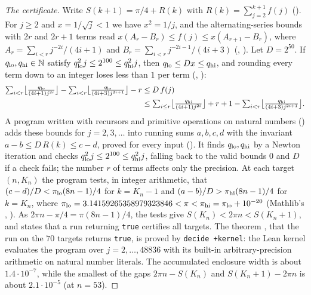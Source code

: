 \documentclass[11pt]{amsart}
\theoremstyle{plain}
\theoremstyle{definition}
\newcommand{\N}{\mathbb{N}}
\begin{document}
\begin{proof}[The certificate]
Write $S(k+1)=\pi/4+R(k)$ with $R(k)=\sum_{j=2}^{k+1}f(j)$ ().
For $j\ge2$ and $x=1/\sqrt j<1$ we have $x^2=1/j$, and the alternating-series bounds with $2r$ and $2r+1$ terms read $x(A_r-B_r)\le f(j)\le x(A_{r+1}-B_r)$, where $A_r=\sum_{i<r}j^{-2i}/(4i+1)$ and $B_r=\sum_{i<r}j^{-2i-1}/(4i+3)$ (, ).
Let $D=2^{50}$. If $q_{\rm lo},q_{\rm hi}\in\N$ satisfy $q_{\rm lo}^2j\le2^{100}\le q_{\rm hi}^2j$, then $q_{\rm lo}\le Dx\le q_{\rm hi}$, and rounding every term down to an integer loses less than $1$ per term (, ):
\begin{align*}
  \textstyle\sum_{i<r}\bigl\lfloor\frac{q_{\rm lo}}{(4i+1)j^{2i}}\bigr\rfloor-\sum_{i<r}\bigl\lfloor\frac{q_{\rm lo}}{(4i+3)j^{2i+1}}\bigr\rfloor-r
  &\le D\,f(j)\\
  &\le\textstyle\sum_{i\le r}\bigl\lfloor\frac{q_{\rm hi}}{(4i+1)j^{2i}}\bigr\rfloor+r+1-\sum_{i<r}\bigl\lfloor\frac{q_{\rm hi}}{(4i+3)j^{2i+1}}\bigr\rfloor .
\end{align*}
A program written with recursors and primitive operations on natural numbers () adds these bounds for $j=2,3,\dots$ into running sums $a,b,c,d$ with the invariant $a-b\le D\,R(k)\le c-d$, proved for every input ().
It finds $q_{\rm lo},q_{\rm hi}$ by a Newton iteration and checks $q_{\rm lo}^2j\le2^{100}\le q_{\rm hi}^2j$, falling back to the valid bounds $0$ and $D$ if a check fails; the number $r$ of terms affects only the precision.
At each target $(n,K_n)$ the program  tests, in integer arithmetic, that $(c-d)/D<\pi_{\rm lo}(8n-1)/4$ for $k=K_n-1$ and $(a-b)/D>\pi_{\rm hi}(8n-1)/4$ for $k=K_n$, where $\pi_{\rm lo}=3.14159265358979323846<\pi<\pi_{\rm hi}=\pi_{\rm lo}+10^{-20}$ (Mathlib's , ).
As $2\pi n-\pi/4=\pi(8n-1)/4$, the tests give $S(K_n)<2\pi n<S(K_n+1)$, and  states that a run returning \texttt{true} certifies all targets.
The theorem , that the run on the $70$ targets returns \texttt{true}, is proved by \texttt{decide +kernel}: the Lean kernel evaluates the program over $j=2,\dots,48836$ with its built-in arbitrary-precision arithmetic on natural number literals.
The accumulated enclosure width is about $1.4\cdot10^{-7}$, while the smallest of the gaps $2\pi n-S(K_n)$ and $S(K_n+1)-2\pi n$ is about $2.1\cdot10^{-5}$ (at $n=53$).
\end{proof}
\end{document}
